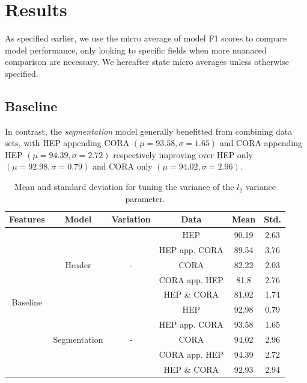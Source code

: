\section{Results}
\label{sec:results}

As specified earlier, we use the micro average of model F1 scores to compare model performance, only looking to specific fields when more nuanaced comparison are necessary. We hereafter state micro averages unless otherwise specified.

\subsection{Baseline}
\label{subsec:baslineresults}

In contrast, the \emph{segmentation} model generally benefitted from combining data sets, with HEP appending CORA $(\mu = 93.58, \sigma = 1.65)$ and CORA appending HEP $(\mu = 94.39, \sigma = 2.72)$ respectively improving over HEP only $(\mu = 92.98, \sigma = 0.79)$ and CORA only $(\mu = 94.02, \sigma = 2.96)$.

\begin{table}[h]
\begin{center}
\begin{tabular}{|c|c|c|c|c|c|}
\hline
Features & Model & Variation & Data & Mean & Std.\\
\hline
\multirow{10}{*}{Baseline} & \multirow{5}{*}{Header} & \multirow{5}{*}{-} & HEP & 90.19 & 2.63\\\cline{4-6}
& & & HEP app. CORA & 89.54 & 3.76\\\cline{4-6}
& & & CORA & 82.22 & 2.03\\\cline{4-6}
& & & CORA app. HEP & 81.8 & 2.76\\\cline{4-6}
& & & HEP \& CORA & 81.02 & 1.74\\\cline{2-6}
& \multirow{5}{*}{Segmentation} & \multirow{5}{*}{-} & HEP & 92.98 & 0.79\\\cline{4-6}
& & & HEP app. CORA & 93.58 & 1.65\\\cline{4-6}
& & & CORA & 94.02 & 2.96\\\cline{4-6}
& & & CORA app. HEP & 94.39 & 2.72\\\cline{4-6}
& & & HEP \& CORA & 92.93 & 2.94\\\cline{4-6}
\hline
\end{tabular}
\caption[Mean and standard deviation for tuning the variance of the $l_2$ variance parameter.]{Mean and standard deviation for tuning the variance of the $l_2$ variance parameter.}
\label{table:baselineresults}
\end{center}
\end{table}

